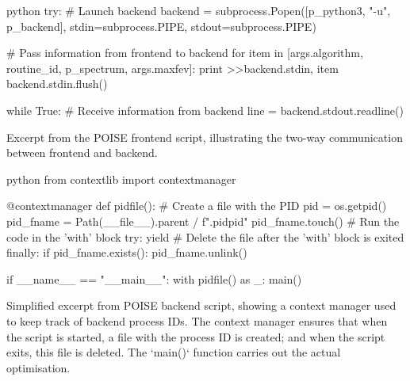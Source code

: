 \begin{mylisting}[htb]
\begin{tcbminted}{python}
try:
    # Launch backend
    backend = subprocess.Popen([p_python3, "-u", p_backend],
                               stdin=subprocess.PIPE,
                               stdout=subprocess.PIPE)

    # Pass information from frontend to backend
    for item in [args.algorithm, routine_id, p_spectrum, args.maxfev]:
        print >>backend.stdin, item
    backend.stdin.flush()

    while True:
        # Receive information from backend
        line = backend.stdout.readline()
\end{tcbminted}
    \caption[Communication between frontend and backend in POISE]{Excerpt from the POISE frontend script, illustrating the two-way communication between frontend and backend.}
    \label{lst:poise_communication}
\end{mylisting}

\begin{mylisting}[htb]
\begin{tcbminted}{python}
from contextlib import contextmanager

@contextmanager
def pidfile():
    # Create a file with the PID
    pid = os.getpid()
    pid_fname = Path(__file__).parent / f".pid{pid}"
    pid_fname.touch()
    # Run the code in the 'with' block
    try:
        yield
    # Delete the file after the 'with' block is exited
    finally:
        if pid_fname.exists():
            pid_fname.unlink()

if __name__ == "__main__":
    with pidfile() as _:
        main()
\end{tcbminted}
    \caption[Context manager to keep track of backend process IDs]{Simplified excerpt from POISE backend script, showing a context manager used to keep track of backend process IDs. The context manager ensures that when the script is started, a file with the process ID is created; and when the script exits, this file is deleted. The `main()` function carries out the actual optimisation.}
    \label{lst:poise_backendpid}
\end{mylisting}

